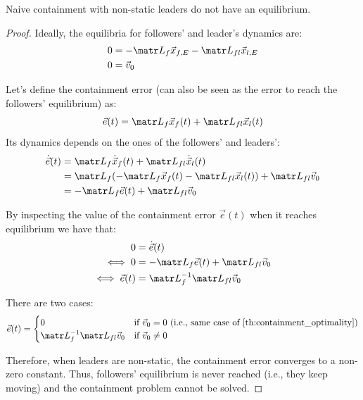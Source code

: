 \begin{theorem}
    Naive containment with non-static leaders do not have an equilibrium.

    \begin{proof}
        Ideally, the equilibria for followers' and leader's dynamics are:
        \[
            \begin{split}
                0 &= -\lap_f \x_{f,E} - \lap_{fl} \x_{l,E} \\
                0 &= \vec{v}_0
            \end{split}
        \]

        Let's define the containment error (can also be seen as the error to reach the followers' equilibrium) as:
        \[
            \vec{e}(t) = \lap_f \x_f(t) + \lap_{fl} \x_l(t)
        \]
        Its dynamics depends on the ones of the followers' and leaders':
        \[
            \begin{split}
                \dot{\vec{e}}(t) &= \lap_f \dot{\x}_f(t) + \lap_{fl} \dot{\x}_l(t) \\
                &= \lap_f (- \lap_f \x_f(t) - \lap_{fl} \x_l(t)) + \lap_{fl} \vec{v}_0 \\
                &= - \lap_f \vec{e}(t) + \lap_{fl} \vec{v}_0
            \end{split}
        \]
        
        By inspecting the value of the containment error $\vec{e}(t)$ when it reaches equilibrium we have that:
        \[
            \begin{split}
                0 &= \dot{\vec{e}}(t) \\
                \iff 0 &= - \lap_f \vec{e}(t) + \lap_{fl} \vec{v}_0 \\
                \iff \vec{e}(t) &= \lap_f^{-1} \lap_{fl} \vec{v}_0 \\
            \end{split}
        \]
        
        There are two cases:
        \[
            \vec{e}(t) = \begin{cases}
                0 & \text{if $\vec{v}_0 = 0$ (i.e., same case of \Cref{th:containment_optimality})} \\
                \lap_f^{-1} \lap_{fl} \vec{v}_0 & \text{if $\vec{v}_0 \neq 0$} \\
            \end{cases}
        \]

        Therefore, when leaders are non-static, the containment error converges to a non-zero constant. Thus, followers' equilibrium is never reached (i.e., they keep moving) and the containment problem cannot be solved.
    \end{proof}
\end{theorem}




